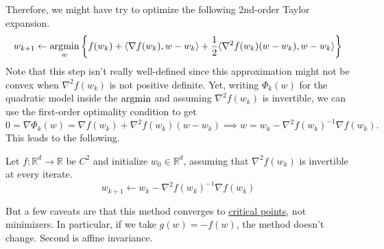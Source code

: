	Therefore, we might have try to optimize the following 2nd-order Taylor expansion. 
	\begin{equation}
		w_{k+1} \gets \operatorname*{\arg\!\min}_w \bigg\{ f(w_k) + \langle \nabla f(w_k), w - w_k \rangle + \frac{1}{2} \langle \nabla^2 f(w_k) (w - w_k), w - w_k \rangle \bigg\}
	\end{equation}
	Note that this step isn't really well-defined since this approximation might not be convex when $\nabla^2 f(w_k)$ is not positive definite. Yet, writing $\Phi_k(w)$ for the quadratic model inside the $\operatorname*{\arg\!\min}$ and assuming $\nabla^2 f(w_k)$ is invertible, we can use the first-order optimality condition to get 
	\begin{equation}
		0 = \nabla \Phi_k(w) = \nabla f(w_k) + \nabla^2 f(w_k) (w - w_k) \implies w = w_k - \nabla^2 f(w_k)^{-1} \nabla f(w_k). 
	\end{equation}
	This leads to the following. 

	\begin{definition}
	  \label{def:netwons-method}
		Let $f: \mathbb{R}^d \to \mathbb{R}$ be $C^2$ and initialize $w_0 \in \mathbb{R}^d$, assuming that $\nabla^2 f(w_k)$ is invertible at every iterate. 
		\begin{equation}
			w_{k+1} \gets w_k - \nabla^2 f(w_k)^{-1} \nabla f(w_k)
		\end{equation}
	\end{definition}

	But a few caveats are that this method converges to \hyperref[real-def:critical-point]{critical points}, not minimizers. \cite{2014pascanu_saddle-point-nonconvex} In particular, if we take $g(w) = -f(w)$, the method doesn't change. Second is affine invariance. 

